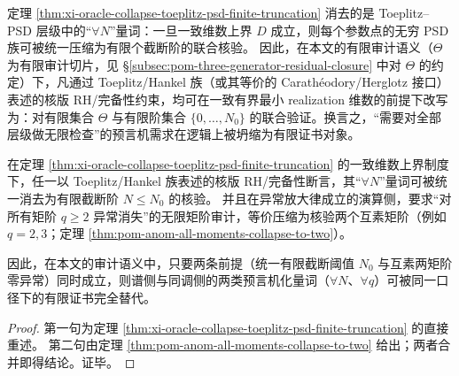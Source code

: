 \begin{remark}\label{rem:xi-oracle-collapse-finite-certification}
定理 \ref{thm:xi-oracle-collapse-toeplitz-psd-finite-truncation} 消去的是 Toeplitz--PSD 层级中的“\(\forall N\)”量词：一旦一致维数上界 \(D\) 成立，则每个参数点的无穷 PSD 族可被统一压缩为有限个截断阶的联合核验。
因此，在本文的有限审计语义（\(\Theta\) 为有限审计切片，见 \S\ref{subsec:pom-three-generator-residual-closure} 中对 \(\Theta\) 的约定）下，凡通过 Toeplitz/Hankel 族（或其等价的 Carath\'eodory/Herglotz 接口）表述的核版 RH/完备性约束，均可在一致有界最小 realization 维数的前提下改写为：对有限集合 \(\Theta\) 与有限阶集合 \(\{0,\dots,N_0\}\) 的联合验证。换言之，“需要对全部层级做无限检查”的预言机需求在逻辑上被坍缩为有限证书对象。
\end{remark}

\begin{corollary}\label{cor:xi-oracle-elimination-two-axes}
在定理 \ref{thm:xi-oracle-collapse-toeplitz-psd-finite-truncation} 的一致维数上界制度下，任一以 Toeplitz/Hankel 族表述的核版 RH/完备性断言，其“\(\forall N\)”量词可被统一消去为有限截断阶 \(N\le N_0\) 的核验。
并且在异常放大律成立的演算侧，要求“对所有矩阶 \(q\ge 2\) 异常消失”的无限矩阶审计，等价压缩为核验两个互素矩阶（例如 \(q=2,3\)；定理 \ref{thm:pom-anom-all-moments-collapse-to-two}）。
\par
因此，在本文的审计语义中，只要两条前提（统一有限截断阈值 \(N_0\) 与互素两矩阶零异常）同时成立，则谱侧与同调侧的两类预言机化量词（\(\forall N\)、\(\forall q\)）可被同一口径下的有限证书完全替代。
\end{corollary}
\begin{proof}
第一句为定理 \ref{thm:xi-oracle-collapse-toeplitz-psd-finite-truncation} 的直接重述。
第二句由定理 \ref{thm:pom-anom-all-moments-collapse-to-two} 给出；两者合并即得结论。证毕。
\end{proof}

